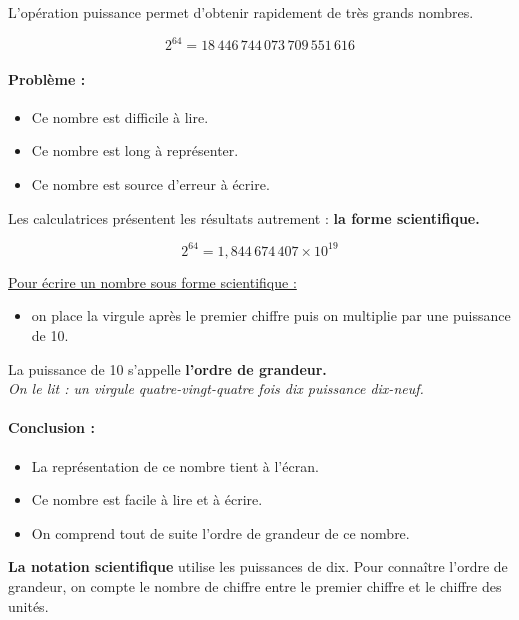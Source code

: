 \documentclass[12pt]{article}
\begin{document}
\begin{multicols}{2}

  L'opération puissance permet d'obtenir rapidement de très grands nombres.

  $$2^{64} = 18 \, 446 \, 744 \, 073 \, 709 \, 551 \, 616$$

  \paragraph{Problème :}

  \begin{itemize}
  \item Ce nombre est difficile à lire.
  \item Ce nombre est long à représenter.
  \item Ce nombre est source d'erreur à écrire.
  \end{itemize}

  Les calculatrices présentent les résultats autrement : \textbf{la forme scientifique.}

  $$2^{64} = 1,844 \, 674 \, 407 \times 10^{19}$$

  \underline{Pour écrire un nombre sous forme scientifique :} \\
  \begin{itemize}
  \item on place la virgule après le premier chiffre puis on multiplie par une puissance de 10. \\
  \end{itemize}

  La puissance de 10 s'appelle \textbf{l'ordre de grandeur.}\\
  \textit{On le lit : un virgule quatre-vingt-quatre fois dix puissance dix-neuf.}

  \paragraph{Conclusion :}

  \begin{itemize}
  \item La représentation de ce nombre tient à l'écran.
  \item Ce nombre est facile à lire et à écrire.
  \item On comprend tout de suite l'ordre de grandeur de ce nombre.
  \end{itemize}

    \textbf{La notation scientifique} utilise les puissances de dix. Pour connaître l'ordre de grandeur, on compte le nombre de chiffre entre le premier chiffre et le chiffre des unités. \\ 

\end{multicols}
\end{document}
